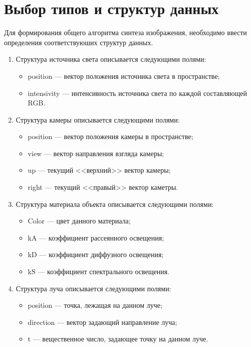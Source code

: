 \section{Выбор типов и структур данных}
Для формирования общего алгоритма синтеза изображения, необходимо ввести определения соответствуюших структур
данных.
\begin{enumerate}
	\item Структура источника света описывается следующими полями:
	\begin{itemize}
		\item position --- вектор положения источника света в пространстве;
		\item intensivity --- интенсивность источника света по каждой составляющей RGB.
	\end{itemize}

	\item Структура камеры описывается следующими полями:
	\begin{itemize}
		\item position --- вектор положения камеры в пространстве;
		\item view --- вектор направления взгляда камеры;
		\item up --- текущий <<верхний>> вектор камеры;
		\item right --- текущий <<правый>> вектор каметры.
	\end{itemize}
	
	\item Структура материала объекта описывается следующими полями:
	\begin{itemize}
		\item Color --- цвет данного материала;
		\item kA --- коэффициент рассеянного освещения;
		\item kD --- коэффициент диффузного освещения;
		\item kS --- коэффициент спектрального освещения.
	\end{itemize}


	\item Структура луча описывается следующими полями:
	\begin{itemize}
		\item position --- точка, лежащая на данном луче;
		\item direction --- вектор задающий направление луча;
		\item t --- вещественное число, задающее точку на данном луче.
	\end{itemize}




\end{enumerate}
